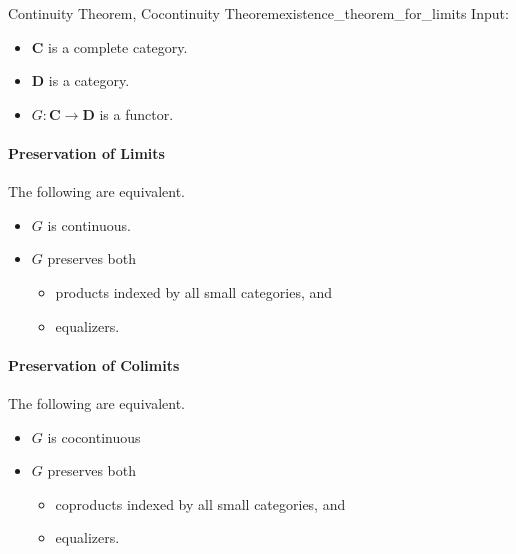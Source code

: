 \documentclass{article}
\begin{document}
\begin{theorem}{Continuity Theorem, Cocontinuity Theorem}{existence_theorem_for_limits}
    Input:
    \begin{itemize}
        \item $\mathbf{C}$ is a complete category.
        \item $\mathbf{D}$ is a category.
        \item $G:\mathbf{C}\rightarrow\mathbf{D}$ is a functor.
    \end{itemize}
    \paragraph*{Preservation of Limits}
    The following are equivalent.
    \begin{itemize}
        \item $G$ is continuous.
        \item $G$ preserves both
        \begin{itemize}
            \item products indexed by all small categories, and
            \item equalizers.
        \end{itemize}
    \end{itemize}
    \tcblower
    \paragraph*{Preservation of Colimits}
    The following are equivalent.
    \begin{itemize}
        \item $G$ is cocontinuous
        \item $G$ preserves both
        \begin{itemize}
            \item coproducts indexed by all small categories, and
            \item equalizers.
        \end{itemize}
    \end{itemize}
\end{theorem}
\end{document}
